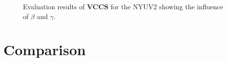 \begin{figure}[b]
	\caption[Evaluation results of \textbf{VCCS} \cite{PaponAbramovSchoelerWoergoetter:2013} obtained on the training set of the NYU Depth Dataset \cite{SilbermanHoiemKohliFergus:2012}.]{Evaluation results of \textbf{VCCS} for the NYUV2 showing the influence of $\beta$ and $\gamma$.}
	\label{fig:evaluation-vccs}
\end{figure}

\section{Comparison}
\label{section:evaluation-comparison}

